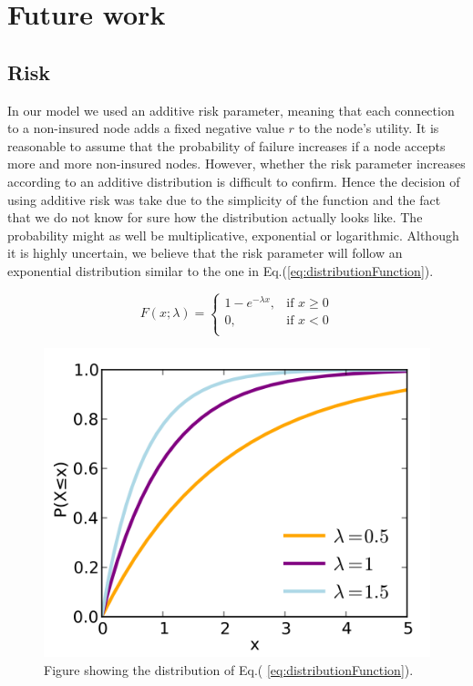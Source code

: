\chapter{Future work}
\label{chp:futurework} 

\section{Risk}
In our model we used an additive risk parameter, meaning that each connection to a non-insured node adds a fixed negative value $r$ to the node's utility. It is reasonable to assume that the probability of failure increases if a node accepts more and more non-insured nodes. However, whether the risk parameter increases according to an additive distribution is difficult to confirm. Hence the decision of using additive risk was take due to the simplicity of the function and the fact that we do not know for sure how the distribution actually looks like. The probability might as well be multiplicative, exponential or logarithmic. Although it is highly uncertain, we believe that the risk parameter will follow an exponential distribution similar to the one in Eq.(\ref{eq:distributionFunction}).

\begin{equation}
    F(x;\lambda)= 
\begin{cases}
    1-e^{-\lambda x} ,& \text{if } x \geq 0\\
   0,& \text{if }  x<0\\
    
    
\end{cases}
\label{eq:distributionFunction}
\end{equation}



\begin{figure}[h]
\centering
  \includegraphics[width=0.5\linewidth]{../Figures/exponentialFunction.png}
  \caption{\label{fig:exponentialFunction} Figure showing the distribution of Eq.( \ref{eq:distributionFunction}). }
\end{figure}

